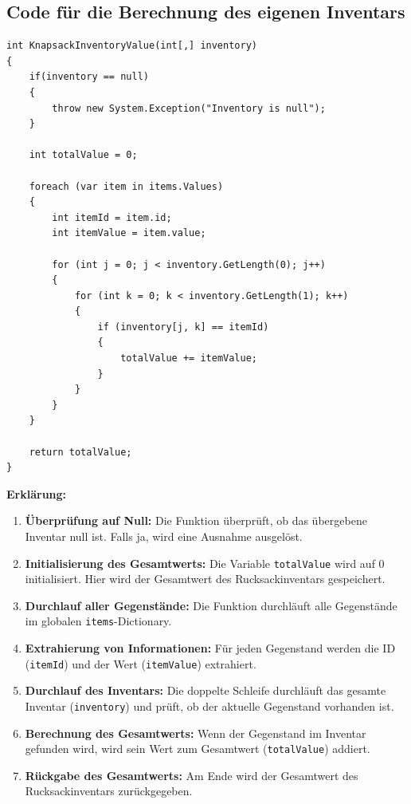 \subsection*{Code für die Berechnung des eigenen Inventars}
\begin{lstlisting}[style=csharp, caption={}, label=code:ownInventory]
int KnapsackInventoryValue(int[,] inventory)
{
    if(inventory == null)
    {
        throw new System.Exception("Inventory is null");
    }

    int totalValue = 0;

    foreach (var item in items.Values)
    {
        int itemId = item.id;
        int itemValue = item.value;

        for (int j = 0; j < inventory.GetLength(0); j++)
        {
            for (int k = 0; k < inventory.GetLength(1); k++)
            {
                if (inventory[j, k] == itemId)
                {
                    totalValue += itemValue;
                }
            }
        }
    }

    return totalValue;
}
\end{lstlisting}
\textbf{Erklärung:}
\begin{enumerate}
    \item \textbf{Überprüfung auf Null:} Die Funktion überprüft, ob das übergebene Inventar null ist. Falls ja, wird eine Ausnahme ausgelöst.

    \item \textbf{Initialisierung des Gesamtwerts:} Die Variable \texttt{totalValue} wird auf 0 initialisiert. Hier wird der Gesamtwert des Rucksackinventars gespeichert.

    \item \textbf{Durchlauf aller Gegenstände:} Die Funktion durchläuft alle Gegenstände im globalen \texttt{items}-Dictionary.

    \item \textbf{Extrahierung von Informationen:} Für jeden Gegenstand werden die ID (\texttt{itemId}) und der Wert (\texttt{itemValue}) extrahiert.

    \item \textbf{Durchlauf des Inventars:} Die doppelte Schleife durchläuft das gesamte Inventar (\texttt{inventory}) und prüft, ob der aktuelle Gegenstand vorhanden ist.

    \item \textbf{Berechnung des Gesamtwerts:} Wenn der Gegenstand im Inventar gefunden wird, wird sein Wert zum Gesamtwert (\texttt{totalValue}) addiert.

    \item \textbf{Rückgabe des Gesamtwerts:} Am Ende wird der Gesamtwert des Rucksackinventars zurückgegeben.
\end{enumerate}

